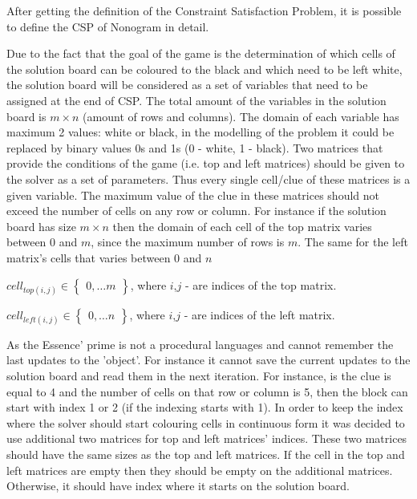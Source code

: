 After getting the definition of the Constraint Satisfaction Problem, it is possible to define the CSP of Nonogram in detail.

Due to the fact that the goal of the game is the determination of which cells of the solution board can be coloured to the black and which need to be left white, the solution board will be considered as a set of variables that need to be assigned at the end of CSP. The total amount of the variables in the solution board is $m\times n$ (amount of rows and columns). The domain of each variable has maximum 2 values: white or black, in the modelling of the problem it could be replaced by binary values 0s and 1s (0 - white, 1 - black). 
Two matrices that provide the conditions of the game (i.e. top and left matrices) should be given to the solver as a set of parameters. Thus every single cell/clue of these matrices is a given variable. The maximum value of the clue in these matrices should not exceed the number of cells on any row or column. For instance if the solution board has size  $m\times n$ then the domain of each cell of the top matrix varies between 0 and $m$, since the maximum number of rows is $m$. The same for the left matrix's cells that varies between 0 and $n$
\begin{center}
$cell_{top(i, j)}\in \left\{ \begin{matrix} 0,\ldots m\end{matrix} \right\}$, where $i$,$j$ - are indices of the top matrix.

$cell_{left(i, j)}\in \left\{ \begin{matrix} 0,\ldots n\end{matrix} \right\}$, where $i$,$j$ - are indices of the left matrix.
\end{center}




As the Essence' prime is not a procedural languages and cannot remember the last updates to the 'object'.  For instance it cannot save the current updates to the solution board and read them in the next iteration. For instance, is the clue is equal to 4 and the number of cells on that row or column is 5, then the block can start with index 1 or 2 (if the indexing starts with 1). In order to keep the index where the solver should start colouring cells in continuous form it was decided to use additional two matrices for top and left matrices' indices. These two matrices should have the same sizes as the top and left matrices. If the cell in the top and left matrices are empty then they should be empty on the additional matrices. Otherwise, it should have index where it starts on the solution board. 

